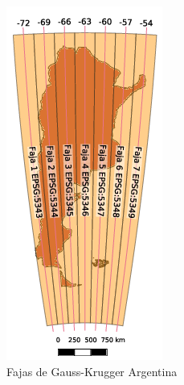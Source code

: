 \documentclass[12pt,]{extarticle}
\begin{document}
\begin{figure}
\includegraphics[width=\linewidth]{../img/image12.png}
\caption{Fajas de Gauss-Krugger Argentina}
\end{figure}
\end{document}
